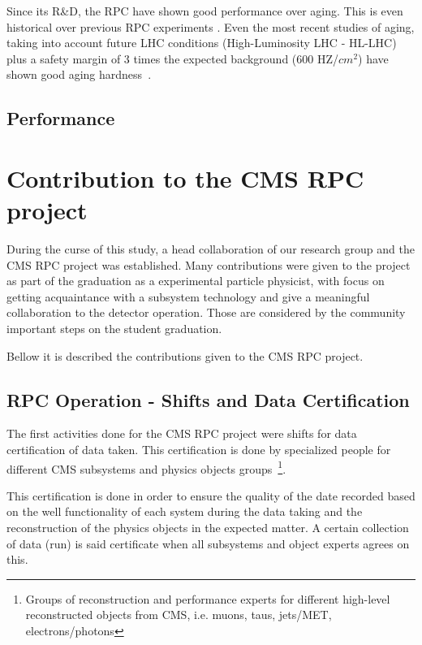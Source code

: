 Since its R\&D, the RPC have shown good performance over aging. This is even historical over previous RPC experiments . Even the most recent studies of aging, taking into account future LHC conditions (High-Luminosity LHC - HL-LHC) plus a safety margin of 3 times the expected background (600 HZ/$cm^2$) have shown good aging hardness~\cite{andrea_rpc_2018}.

\subsection{Performance}


\section{Contribution to the CMS RPC project}

During the curse of this study, a head collaboration of our research group and the CMS RPC project was established. Many contributions were given to the project as part of the graduation as a experimental particle physicist, with focus on getting acquaintance with a subsystem technology and give a meaningful collaboration to the detector operation.  Those are considered by the community important steps on the student graduation.

Bellow it is described the contributions given to the CMS RPC project.

\subsection{RPC Operation - Shifts and Data Certification}

The first activities done for the CMS RPC project were shifts for data certification of data taken. This certification is done by specialized people for different CMS subsystems and physics objects groups~\footnote{Groups of reconstruction and performance experts for different high-level reconstructed objects from CMS, i.e. muons, taus, jets/MET, electrons/photons}. 
 
This certification is done in order to ensure the quality of the date recorded based on the well functionality of each system during the data taking and the reconstruction of the physics objects in the expected matter. A certain collection of data (run) is said certificate when all subsystems and object experts agrees on this.

